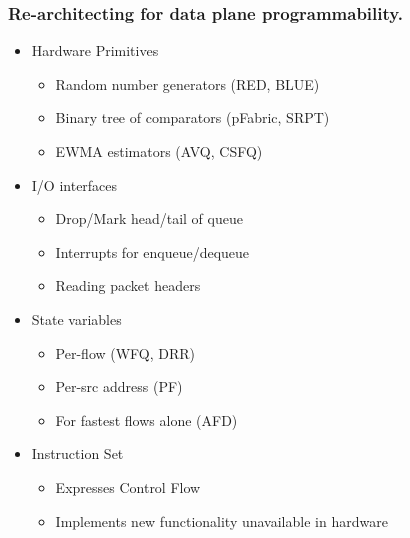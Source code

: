 \begin{frame}[plain]
\frametitle{Re-architecting for data plane programmability.}
\begin{itemize}
\item Hardware Primitives
      \begin{itemize}
      \item Random number generators (RED, BLUE)
      \item Binary tree of comparators (pFabric, SRPT)
      \item EWMA estimators (AVQ, CSFQ)
      \end{itemize}

\item I/O interfaces
      \begin{itemize}
      \item Drop/Mark head/tail of queue
      \item Interrupts for enqueue/dequeue
      \item Reading packet headers
      \end{itemize}

\item State variables
      \begin{itemize}
      \item Per-flow (WFQ, DRR)
      \item Per-src address (PF)
      \item For fastest flows alone (AFD)
      \end{itemize}

\item Instruction Set
      \begin{itemize}
      \item Expresses Control Flow
      \item Implements new functionality unavailable in hardware
      \end{itemize}
\end{itemize}
\end{frame}

